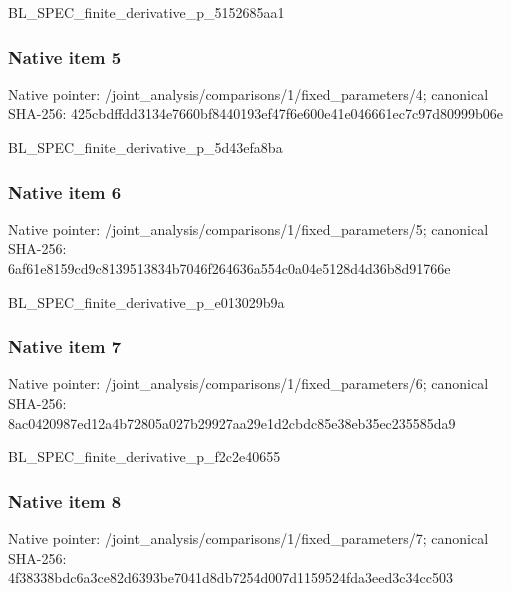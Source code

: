 \documentclass[10pt,a4paper]{article}
\begin{document}
\begingroup\raggedright\sloppy BL\_\allowbreak{}SPEC\_\allowbreak{}finite\_\allowbreak{}derivative\_\allowbreak{}p\_\allowbreak{}5152685aa1\par\endgroup

\subsubsection{Native item 5}
Native pointer: /joint\_\allowbreak{}analysis/comparisons/1/fixed\_\allowbreak{}parameters/4; canonical SHA-256: 425cbdffdd3134e7660bf8440193ef47f6e600e41e046661ec7c97d80999b06e

\begingroup\raggedright\sloppy BL\_\allowbreak{}SPEC\_\allowbreak{}finite\_\allowbreak{}derivative\_\allowbreak{}p\_\allowbreak{}5d43efa8ba\par\endgroup

\subsubsection{Native item 6}
Native pointer: /joint\_\allowbreak{}analysis/comparisons/1/fixed\_\allowbreak{}parameters/5; canonical SHA-256: 6af61e8159cd9c8139513834b7046f264636a554c0a04e5128d4d36b8d91766e

\begingroup\raggedright\sloppy BL\_\allowbreak{}SPEC\_\allowbreak{}finite\_\allowbreak{}derivative\_\allowbreak{}p\_\allowbreak{}e013029b9a\par\endgroup

\subsubsection{Native item 7}
Native pointer: /joint\_\allowbreak{}analysis/comparisons/1/fixed\_\allowbreak{}parameters/6; canonical SHA-256: 8ac0420987ed12a4b72805a027b29927aa29e1d2cbdc85e38eb35ec235585da9

\begingroup\raggedright\sloppy BL\_\allowbreak{}SPEC\_\allowbreak{}finite\_\allowbreak{}derivative\_\allowbreak{}p\_\allowbreak{}f2c2e40655\par\endgroup

\subsubsection{Native item 8}
Native pointer: /joint\_\allowbreak{}analysis/comparisons/1/fixed\_\allowbreak{}parameters/7; canonical SHA-256: 4f38338bdc6a3ce82d6393be7041d8db7254d007d1159524fda3eed3c34cc503
\end{document}
